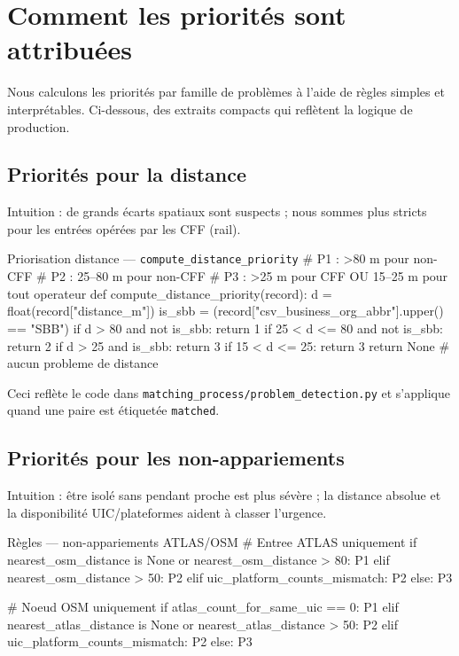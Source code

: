 \section{Comment les priorités sont attribuées}
Nous calculons les priorités par famille de problèmes à l'aide de règles simples et interprétables. Ci-dessous, des extraits compacts qui reflètent la logique de production.

\subsection{Priorités pour la distance}
Intuition : de grands écarts spatiaux sont suspects ; nous sommes plus stricts pour les entrées opérées par les CFF (rail).

\begin{codebox}[language=Python]{Priorisation distance — \texttt{compute\_distance\_priority}}
# P1 : >80 m pour non-CFF
# P2 : 25--80 m pour non-CFF
# P3 : >25 m pour CFF OU 15--25 m pour tout operateur
def compute_distance_priority(record):
    d = float(record["distance_m"])
    is_sbb = (record["csv_business_org_abbr"].upper() == "SBB")
    if d > 80 and not is_sbb:
        return 1
    if 25 < d <= 80 and not is_sbb:
        return 2
    if d > 25 and is_sbb:
        return 3
    if 15 < d <= 25:
        return 3
    return None  # aucun probleme de distance
\end{codebox}

\noindent Ceci reflète le code dans \texttt{matching\_process/problem\_detection.py} et s'applique quand une paire est étiquetée \texttt{matched}.

\subsection{Priorités pour les non-appariements}
Intuition : être isolé sans pendant proche est plus sévère ; la distance absolue et la disponibilité UIC/plateformes aident à classer l'urgence.

\begin{codebox}[language=Python]{Règles — non-appariements ATLAS/OSM}
# Entree ATLAS uniquement
if nearest_osm_distance is None or nearest_osm_distance > 80:
    P1
elif nearest_osm_distance > 50:
    P2
elif uic_platform_counts_mismatch:
    P2
else:
    P3

# Noeud OSM uniquement
if atlas_count_for_same_uic == 0:
    P1
elif nearest_atlas_distance is None or nearest_atlas_distance > 50:
    P2
elif uic_platform_counts_mismatch:
    P2
else:
    P3
\end{codebox}

